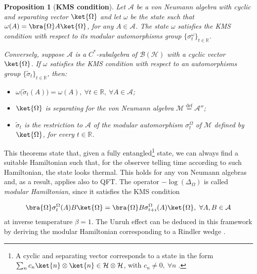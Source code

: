 \documentclass[a4paper,11pt]{article}
\newcommand{\eqdef}{\overset{\mathrm{def}}{=}}
\newtheorem{Proposition}{Proposition}[subsection]
\begin{document}
\begin{Proposition}[\textbf{KMS condition}]
    Let $\mathcal{A}$ be a von Neumann algebra with cyclic and separating vector $\ket{\Omega}$ and let $\omega$ be the state such that $\omega(A) = \bra{\Omega} A \ket{\Omega}$, for any $A \in \mathcal{A}$. The state $\omega$ satisfies the KMS condition with respect to its modular automorphisms group $\{ \sigma_t^{\omega} \}_{t \in \mathbb{R}}$.
    
    Conversely, suppose $\mathcal{A}$ is a $C^*$-subalgebra of $\mathcal{B}(\mathcal{H})$ with a cyclic vector $\ket{\Omega}$. If $\omega$ satisfies the KMS condition with respect to an automorphisms group $\{ \tilde{\sigma}_t \}_{t \in \mathbb{R}}$, then:

    \begin{itemize}
        \item $\omega \big( \tilde{\sigma}_t(A) \big) = \omega(A), \ \forall t \in \mathbb{R}, \ \forall A \in \mathcal{A}$;
        \item $\ket{\Omega}$ is separating for the von Neumann algebra $\mathcal{M} \eqdef \mathcal{A}''$;
        \item $\tilde{\sigma}_t$ is the restriction to $\mathcal{A}$ of the modular automorphism $\sigma_t^{\Omega}$ of $\mathcal{M}$ defined by $\ket{\Omega}$, for every $t \in \mathbb{R}$.
    \end{itemize}
\end{Proposition}

This theorems state that, given a fully entangled\footnote{A cyclic and separating vector corresponds to a state in the form $\sum_n c_n \ket{n} \otimes \ket{n} \in \mathcal{H} \otimes \mathcal{H}$, with $c_n \neq 0, \ \forall n$ \cite{Witten}.} state, we can always find a suitable Hamiltonian such that, for the observer telling time according to such Hamiltonian, the state looks thermal. This holds for any von Neumann algebras and, as a result, applies also to QFT. The operator $- \log(\Delta_{\Omega})$ is called \textit{modular Hamiltonian}, since it satisfies the KMS condition \cite{Kubo} \cite{Martin-Schwinger}

\begin{equation}
    \bra{\Omega} \sigma_t^{\Omega}(A) B \ket{\Omega} = \bra{\Omega} B \sigma_{t+i}^{\Omega}(A) \ket{\Omega}, \ \forall A, B \in \mathcal{A}
\end{equation}
%
at inverse temperature $\beta = 1$. The Unruh effect can be deduced in this framework by deriving the modular Hamiltonian corresponding to a Rindler wedge \cite{Bisognano-Wichmann} \cite{Unruh}.
\end{document}
